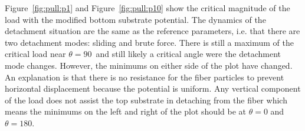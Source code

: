 Figure~\ref{fig:pull:p1} and Figure~\ref{fig:pull:p10} show the critical magnitude of the load with the modified bottom substrate potential. The dynamics of the detachment situation are the same as the reference parameters, i.e. that there are two detachment modes: sliding and brute force. There is still a maximum of the critical load near $\theta=90$\textdegree ~and still likely a critical angle were the detachment mode changes. However, the minimums on either side of the plot have changed. An explanation is that there is no resistance for the fiber particles to prevent horizontal displacement because the potential is uniform. Any vertical component of the load does not assist the top substrate in detaching from the fiber which means the minimums on the left and right of the plot should be at $\theta=0$ and $\theta=180$.
	